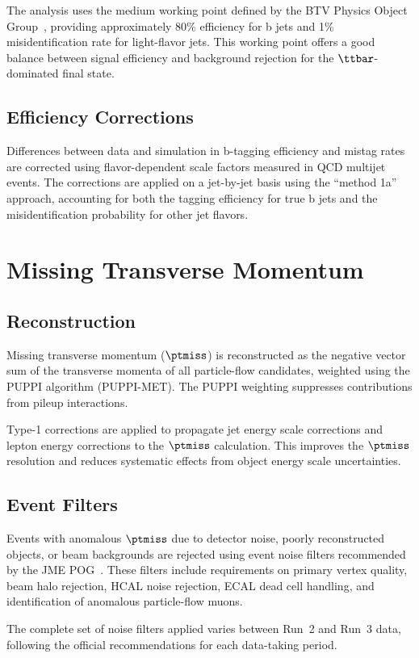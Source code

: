The analysis uses the medium working point defined by the BTV Physics Object Group~\cite{BTVRecommendation}, providing approximately 80\% efficiency for b jets and 1\% misidentification rate for light-flavor jets. This working point offers a good balance between signal efficiency and background rejection for the $\ttbar$-dominated final state.

\subsection{Efficiency Corrections}

Differences between data and simulation in b-tagging efficiency and mistag rates are corrected using flavor-dependent scale factors measured in QCD multijet events. The corrections are applied on a jet-by-jet basis using the ``method 1a'' approach, accounting for both the tagging efficiency for true b jets and the misidentification probability for other jet flavors.

\section{Missing Transverse Momentum}
\label{sec:met}

\subsection{Reconstruction}

Missing transverse momentum ($\ptmiss$) is reconstructed as the negative vector sum of the transverse momenta of all particle-flow candidates, weighted using the PUPPI algorithm (PUPPI-MET). The PUPPI weighting suppresses contributions from pileup interactions.

Type-1 corrections are applied to propagate jet energy scale corrections and lepton energy corrections to the $\ptmiss$ calculation. This improves the $\ptmiss$ resolution and reduces systematic effects from object energy scale uncertainties.

\subsection{Event Filters}

Events with anomalous $\ptmiss$ due to detector noise, poorly reconstructed objects, or beam backgrounds are rejected using event noise filters recommended by the JME POG~\cite{METFilters}. These filters include requirements on primary vertex quality, beam halo rejection, HCAL noise rejection, ECAL dead cell handling, and identification of anomalous particle-flow muons.

The complete set of noise filters applied varies between Run~2 and Run~3 data, following the official recommendations for each data-taking period.
